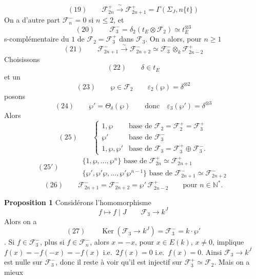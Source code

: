 \documentclass[11pt,a4paper]{article}
\begin{document}
\[
  (19) \qquad \mathcal{F}_{2n}^+ \xrightarrow{\;\sim\;} \mathcal{F}_{2n+1}^+
  = \Gamma(\Sigma_J, n\{t\})
\]
On a d'autre part $\mathcal{F}_n^- = 0$ si $n \leqslant 2$, et
\[
  (20) \qquad \mathcal{F}_3^- = \delta_2(t_E \otimes \mathcal{F}_2) \simeq t_E^{\otimes 3}
\]
s-complémentaire du  $1$ de $\mathcal{F}_2 = \mathcal{F}_3^+$ dans
$\mathcal{F}_3$. On a alors, pour  
$n \geqslant 1$
\[
  (21) \qquad \mathcal{F}_{2n+1}^- \xrightarrow{\;\sim\;} \mathcal{F}_{2n+2}^- \simeq
  \mathcal{F}_3^- \otimes_k \mathcal{F}_{2n-2}^+
\]
Choisissons
\[
  (22) \qquad \delta \in t_E
\]
et un
\[
  (23) \qquad \wp \in \mathcal{F}_2 \qquad \varepsilon_2(\wp) = \delta^{\otimes 2}
\]
posons
\[
  (24) \qquad \wp' = \Theta_\delta(\wp) \qquad \text{donc}\quad
  \varepsilon_3(\wp') = \delta^{\otimes 3}
\]
Alors
\[
  (25) \qquad
  \begin{cases}
    1, \wp & \text{base de } \mathcal{F}_2 = \mathcal{F}_2^+ = \mathcal{F}_3^+ \\
    \wp' & \text{base de } \mathcal{F}_3^- \\
    1, \wp, \wp' & \text{base de } \mathcal{F}_3 = \mathcal{F}_3^+ \oplus \mathcal{F}_3^- .
  \end{cases}
\]
\[
  (25') \qquad
  \begin{aligned}
    & \{1, \wp, \ldots, \wp^n\} \text{ base de } \mathcal{F}_{2n}^+ \simeq \mathcal{F}_{2n+1}^+ \\
    & \{\wp', \wp'\wp, \ldots, \wp'\wp^{n-1}\} \text{ base de }
      \mathcal{F}_{2n+1}^- \simeq \mathcal{F}_{2n+2}^-
  \end{aligned}
\]
\[
  (26) \qquad \mathcal{F}_{2n+1}^- = \mathcal{F}_{2n+2}^- = \wp'\, \mathcal{F}_{2n-2}^+
  \qquad \text{pour } n \in \mathbb{N}^* .
\]

\textbf{Proposition 1} \quad Considérons l'homomorphisme
\[
  f \longmapsto f \mid J \qquad \mathcal{F}_3 \longrightarrow k^J
\]
Alors on a
\[
  (27) \qquad \operatorname{Ker}(\mathcal{F}_3 \to k^J) = \mathcal{F}_3^- = k \cdot \wp'
\]
. Si $f \in \mathcal{F}_3^-$, plus  si
$f \in \mathcal{F}_n^-$, alors $x = -x$, pour $x \in E(k)$, $x \neq 0$,
implique $f(x) = -f(-x) = -f(x)$ i.e.\ $2f(x) = 0$ i.e.\ $f(x) = 0$. Ainsi
$\mathcal{F}_3 \to k^J$ est nulle sur $\mathcal{F}_3^-$, donc il reste à voir
qu'il est injectif sur $\mathcal{F}_3^+ \simeq \mathcal{F}_2$. Mais on a mieux
\end{document}
